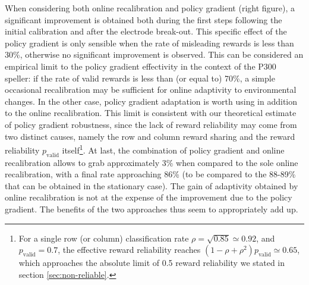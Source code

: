 \documentclass[conference]{IEEEtran}
\begin{document}
When considering both online recalibration and policy gradient (right figure), a significant improvement is obtained both during the first steps 
following the initial calibration and after the electrode break-out.
This specific effect of the policy gradient is only sensible when the rate of misleading rewards is less than 30\%, otherwise no 
significant improvement is observed.
This can be considered an empirical limit to the policy gradient effectivity in the context of the
P300 speller: if the rate of valid rewards is
less than (or equal to) 70\%, a simple occasional recalibration may be sufficient for online adaptivity to environmental
changes. In the other case,  policy gradient adaptation is worth using in addition to the online recalibration.
This limit is consistent with our theoretical estimate of policy gradient robustness, since the lack of reward reliability may come from 
two distinct causes, namely the 
row and column reward sharing and the reward reliability $p_\text{valid}$ itself\footnote{
For a single row (or column) classification rate $\rho = \sqrt{0.85} \simeq 0.92$, and $p_\text{valid} = 0.7$, 
the effective reward reliability reaches
$(1-\rho+\rho^2) p_\text{valid}\simeq 0.65$, 
which approaches the absolute limit of 0.5 reward reliability we 
stated in section \ref{sec:non-reliable}.
}. 
At last, the combination of policy gradient and online recalibration allows to grab approximately 3\% 
when compared to the sole online recalibration, with a final rate approaching 86\% (to be compared to the 88-89\% 
that can be obtained in the stationary case).
The gain of adaptivity obtained by online recalibration is not at the expense of the improvement
due to the policy gradient. The benefits of the two approaches thus seem to appropriately add up.


\end{document}
